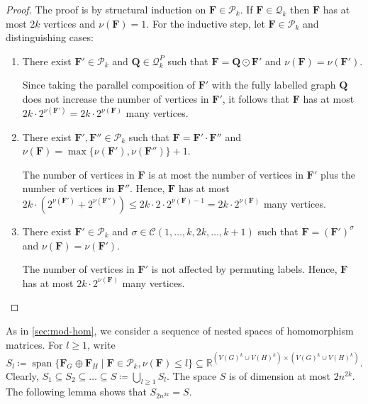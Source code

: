 \documentclass[11pt,a4paper]{article}
\theoremstyle{plain}
\theoremstyle{remark}
\theoremstyle{definition}
\DeclareMathOperator{\spn}{span}
\newcommand{\cyclicpermutations}{\mathscr{C}(1,\dots, k, 2k, \dots, k+1)}
\begin{document}
\begin{proof}
	The proof is by structural induction on $\boldsymbol{F} \in \mathcal{P}_k$.
	If $\boldsymbol{F} \in \mathcal{Q}_k$ then $\boldsymbol{F}$ has at most $2k$ vertices and $\nu(\boldsymbol{F}) = 1$.
	For the inductive step, let $\boldsymbol{F} \in \mathcal{P}_k$ and distinguishing cases:
	\begin{enumerate}
		\item There exist $\boldsymbol{F}' \in \mathcal{P}_k$ and $\boldsymbol{Q} \in \mathcal{Q}_k^P$ such that $\boldsymbol{F} = \boldsymbol{Q} \odot \boldsymbol{F}'$ and $\nu(\boldsymbol{F}) = \nu(\boldsymbol{F}')$.
		
		Since taking the parallel composition of $\boldsymbol{F}'$ with the fully labelled graph $\boldsymbol{Q}$ does  not increase the number of vertices in $\boldsymbol{F}'$, it follows that $\boldsymbol{F}$ has at most $2k \cdot 2^{\nu(\boldsymbol{F}')} = 2k \cdot 2^{\nu(\boldsymbol{F})}$ many vertices.
		
		\item There exist $\boldsymbol{F}', \boldsymbol{F}'' \in \mathcal{P}_k$ such that $\boldsymbol{F} = \boldsymbol{F}' \cdot \boldsymbol{F}''$ and $\nu(\boldsymbol{F}) = \max\{ \nu(\boldsymbol{F}'), \nu(\boldsymbol{F}'')\} +1$.
		
		The number of vertices in $\boldsymbol{F}$ is at most the number of vertices in $\boldsymbol{F}'$ plus the number of vertices in $\boldsymbol{F}''$.
		Hence, $\boldsymbol{F}$ has at most $2k \cdot (2^{\nu(\boldsymbol{F}')} + 2^{\nu(\boldsymbol{F}'')}) \leq 2k \cdot 2 \cdot 2^{\nu(\boldsymbol{F}) - 1} = 2k \cdot 2^{\nu(\boldsymbol{F})}$ many vertices.
		
		\item There exist $\boldsymbol{F}' \in \mathcal{P}_k$ and $\sigma \in \cyclicpermutations$ such that $\boldsymbol{F} = (\boldsymbol{F}')^\sigma$ and $\nu(\boldsymbol{F}) = \nu(\boldsymbol{F}')$.
		
		The number of vertices in $\boldsymbol{F}'$ is not affected by permuting labels. Hence, $\boldsymbol{F}$ has at most $2k \cdot 2^{\nu(\boldsymbol{F})}$ many vertices. \qedhere
	\end{enumerate} 
\end{proof}

As in \cref{sec:mod-hom}, we consider a sequence of nested spaces of homomorphism matrices. For $l \geq 1$, write
\[
	S_l \coloneqq \spn \{ \boldsymbol{F}_G \oplus \boldsymbol{F}_H \mid \boldsymbol{F} \in \mathcal{P}_k, \nu(\boldsymbol{F}) \leq l \} 
	\subseteq \mathbb{R}^{(V(G)^k \cup V(H)^k) \times (V(G)^k \cup V(H)^k)}.
\]
Clearly, $S_1 \subseteq S_2 \subseteq \dots \subseteq S \coloneqq \bigcup_{l \geq 1} S_l$.
The space $S$ is of dimension at most $2n^{2k}$.
The following lemma shows that $S_{2n^{2k}} = S$.
\end{document}
